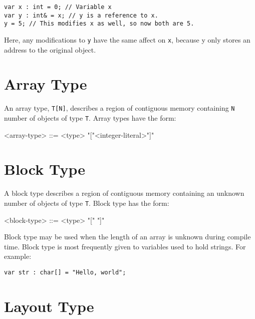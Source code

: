 \begin{minip}
\begin{lstlisting}
var x : int = 0; // Variable x
var y : int& = x; // y is a reference to x.
y = 5; // This modifies x as well, so now both are 5.
\end{lstlisting}
\end{minip}

Here, any modifications to \texttt{y} have the same affect on \texttt{x}, because y only stores an address to the original object.

\section{Array Type} \label{guide:array_type}

An array type, \texttt{T[N]}, describes a region of contiguous memory containing \texttt{N} number of objects of type \texttt{T}. Array types have the form: 

\begin{minip}
\begin{grammar}
<array-type> ::= <type> "["<integer-literal>"]"
\end{grammar}
\end{minip}

\section{Block Type} \label{guide:block_type}

A block type describes a region of contiguous memory containing an unknown number of objects of type \texttt{T}. Block type has the form:

\begin{minip}
\begin{grammar}
<block-type> ::= <type> "[" "]"
\end{grammar}
\end{minip}

Block type may be used when the length of an array is unknown during compile time. Block type is most frequently given to variables used to hold strings. For example:

\begin{minip}
\begin{lstlisting}
var str : char[] = "Hello, world";
\end{lstlisting}
\end{minip}

\section{Layout Type} \label{guide:layout_type}

